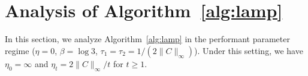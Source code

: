 \documentclass[10pt]{article}
\theoremstyle{plain}
\newtheorem{lemma}[theorem]{Lemma}
\theoremstyle{definition}
\theoremstyle{remark}
\begin{document}
    

\section{Analysis of Algorithm~\ref{alg:lamp}}\label{appdx:analysis}

In this section, we analyze Algorithm~\ref{alg:lamp} in the performant parameter regime ($\eta =0$, $\beta=\log 3$, $\tau_1=\tau_2=1/(2\|C\|_\infty)$). Under this setting, we have $\eta_0=\infty$ and $\eta_t=2\|C\|_\infty/t$ for $t\geq 1$.
\end{document}
